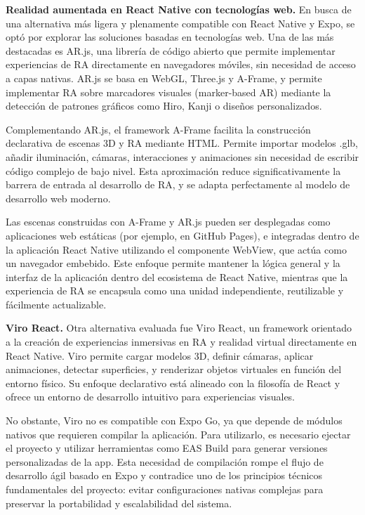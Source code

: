 \textbf{Realidad aumentada en React Native con tecnologías web.}
En busca de una alternativa más ligera y plenamente compatible con React Native y Expo, se optó por explorar las soluciones basadas en tecnologías web. Una de las más destacadas es AR.js, una librería de código abierto que permite implementar experiencias de RA directamente en navegadores móviles, sin necesidad de acceso a capas nativas. AR.js se basa en WebGL, Three.js y A-Frame, y permite implementar RA sobre marcadores visuales (marker-based AR) mediante la detección de patrones gráficos como Hiro, Kanji o diseños personalizados.

Complementando AR.js, el framework A-Frame facilita la construcción declarativa de escenas 3D y RA mediante HTML. Permite importar modelos .glb, añadir iluminación, cámaras, interacciones y animaciones sin necesidad de escribir código complejo de bajo nivel. Esta aproximación reduce significativamente la barrera de entrada al desarrollo de RA, y se adapta perfectamente al modelo de desarrollo web moderno.

Las escenas construidas con A-Frame y AR.js pueden ser desplegadas como aplicaciones web estáticas (por ejemplo, en GitHub Pages), e integradas dentro de la aplicación React Native utilizando el componente WebView, que actúa como un navegador embebido. Este enfoque permite mantener la lógica general y la interfaz de la aplicación dentro del ecosistema de React Native, mientras que la experiencia de RA se encapsula como una unidad independiente, reutilizable y fácilmente actualizable.

\textbf{Viro React.}
Otra alternativa evaluada fue Viro React, un framework orientado a la creación de experiencias inmersivas en RA y realidad virtual directamente en React Native. Viro permite cargar modelos 3D, definir cámaras, aplicar animaciones, detectar superficies, y renderizar objetos virtuales en función del entorno físico. Su enfoque declarativo está alineado con la filosofía de React y ofrece un entorno de desarrollo intuitivo para experiencias visuales.

No obstante, Viro no es compatible con Expo Go, ya que depende de módulos nativos que requieren compilar la aplicación. Para utilizarlo, es necesario ejectar el proyecto y utilizar herramientas como EAS Build para generar versiones personalizadas de la app. Esta necesidad de compilación rompe el flujo de desarrollo ágil basado en Expo y contradice uno de los principios técnicos fundamentales del proyecto: evitar configuraciones nativas complejas para preservar la portabilidad y escalabilidad del sistema.

